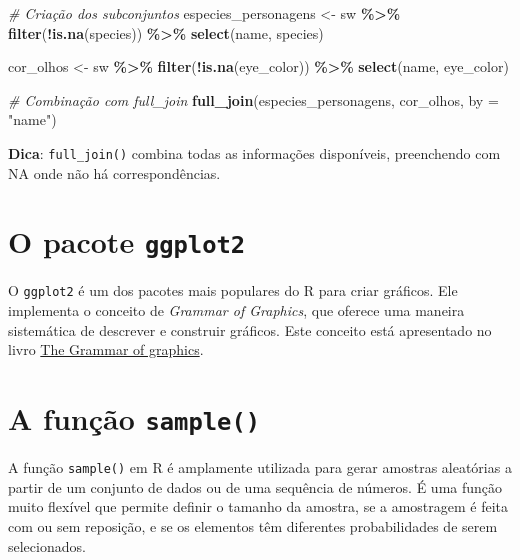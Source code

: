 \documentclass[
]{book}
\newenvironment{Shaded}{\begin{snugshade}}{\end{snugshade}}
\newcommand{\AttributeTok}[1]{\textcolor[rgb]{0.13,0.29,0.53}{#1}}
\newcommand{\CommentTok}[1]{\textcolor[rgb]{0.56,0.35,0.01}{\textit{#1}}}
\newcommand{\FunctionTok}[1]{\textcolor[rgb]{0.13,0.29,0.53}{\textbf{#1}}}
\newcommand{\NormalTok}[1]{#1}
\newcommand{\OtherTok}[1]{\textcolor[rgb]{0.56,0.35,0.01}{#1}}
\newcommand{\SpecialCharTok}[1]{\textcolor[rgb]{0.81,0.36,0.00}{\textbf{#1}}}
\newcommand{\StringTok}[1]{\textcolor[rgb]{0.31,0.60,0.02}{#1}}
\begin{document}
\begin{Shaded}
\begin{Highlighting}[]
\CommentTok{\# Criação dos subconjuntos}
\NormalTok{especies\_personagens }\OtherTok{\textless{}{-}}\NormalTok{ sw }\SpecialCharTok{\%\textgreater{}\%} 
  \FunctionTok{filter}\NormalTok{(}\SpecialCharTok{!}\FunctionTok{is.na}\NormalTok{(species)) }\SpecialCharTok{\%\textgreater{}\%} 
  \FunctionTok{select}\NormalTok{(name, species)}

\NormalTok{cor\_olhos }\OtherTok{\textless{}{-}}\NormalTok{ sw }\SpecialCharTok{\%\textgreater{}\%} 
  \FunctionTok{filter}\NormalTok{(}\SpecialCharTok{!}\FunctionTok{is.na}\NormalTok{(eye\_color)) }\SpecialCharTok{\%\textgreater{}\%} 
  \FunctionTok{select}\NormalTok{(name, eye\_color)}

\CommentTok{\# Combinação com full\_join}
\FunctionTok{full\_join}\NormalTok{(especies\_personagens, cor\_olhos, }\AttributeTok{by =} \StringTok{"name"}\NormalTok{)}
\end{Highlighting}
\end{Shaded}

\textbf{Dica}: \texttt{full\_join()} combina todas as informações disponíveis,
preenchendo com NA onde não há correspondências.

\chapter{\texorpdfstring{O pacote \texttt{ggplot2}}{O pacote ggplot2}}\label{o-pacote-ggplot2}

O \texttt{ggplot2} é um dos pacotes mais populares do R para criar gráficos.
Ele implementa o conceito de \emph{Grammar of Graphics}, que oferece uma
maneira sistemática de descrever e construir gráficos. Este conceito
está apresentado no livro \href{https://link.springer.com/book/10.1007/0-387-28695-0}{The Grammar of
graphics}.

\chapter{\texorpdfstring{A função \texttt{sample()}}{A função sample()}}\label{a-funuxe7uxe3o-sample}

A função \texttt{sample()} em R é amplamente utilizada para gerar amostras
aleatórias a partir de um conjunto de dados ou de uma sequência de
números. É uma função muito flexível que permite definir o tamanho da
amostra, se a amostragem é feita com ou sem reposição, e se os elementos
têm diferentes probabilidades de serem selecionados.
\end{document}
